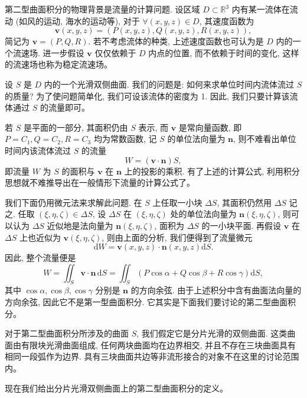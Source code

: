 \documentclass[12pt,fontset=fandol]{ctexart}
\begin{document}
第二型曲面积分的物理背景是流量的计算问题. 设区域 $D\subset\mathbb R^3$ 内有某一流体在流动 (如风的运动, 海水的运动等), 对于 $\forall(x,y,z)\in D$, 其速度函数为
\[
  \boldsymbol v(x,y,z)=(P(x,y,z),Q(x,y,z),R(x,y,z)),
\]
简记为 $\boldsymbol v=(P,Q,R)$. 若不考虑流体的种类, 上述速度函数也可认为是 $D$ 内的一个流速场. 进一步假设 $\boldsymbol v$ 仅仅依赖于 $D$ 内点的位置, 而不依赖于时间的变化, 这样的流速场也称为稳定流速场。

设 $S$ 是 $D$ 内的一个光滑双侧曲面. 我们的问题是: 如何来求单位时间内流体流过 $S$ 的质量? 为了使问题简单化, 我们可设该流体的密度为 1. 因此, 我们只要计算该流体通过 $S$ 的流量即可。

若 $S$ 是平面的一部分, 其面积仍由 $S$ 表示, 而 $\boldsymbol v$ 是常向量函数, 即 $P=C_1,Q=C_2,R=C_3$ 均为常数函数, 记 $S$ 的单位法向量为 $\boldsymbol n$, 则不难看出单位时间内该流体流过 $S$ 的流量
\[
  W=(\boldsymbol v\cdot\boldsymbol n)S,
\]
即流量 $W$ 为 $S$ 的面积与 $\boldsymbol v$ 在 $\boldsymbol n$ 上的投影的乘积. 有了上述的计算公式, 利用积分思想就不难推导出在一般情形下流量的计算公式了。

我们下面仍用微元法来求解此问题. 在 $S$ 上任取一小块 $\Delta S$, 其面积仍然用 $\Delta S$ 记之. 任取 $(\xi,\eta,\zeta)\in\Delta S$, 设 $\Delta S$ 在 $(\xi,\eta,\zeta)$ 处的单位法向量为 $\boldsymbol n(\xi,\eta,\zeta)$, 则可以认为 $\Delta S$ 近似地是法向量为 $\boldsymbol n(\xi,\eta,\zeta)$, 面积为 $\Delta S$ 的一小块平面. 再假设 $\boldsymbol v$ 在 $\Delta S$ 上也近似为 $\boldsymbol v(\xi,\eta,\zeta)$, 则由上面的分析, 我们便得到了流量微元
\[
  \mathrm dW=\boldsymbol v(x,y,z)\cdot\boldsymbol n(x,y,z)\mathrm dS.
\]
因此, 整个流量便是
\[
  W=\iint_S\boldsymbol v\cdot\boldsymbol n\,\mathrm dS
  =\iint_S(P\cos\alpha+Q\cos\beta+R\cos\gamma)\mathrm dS,
\]
其中 $\cos\alpha,\cos\beta,\cos\gamma$ 分别是 $\boldsymbol n$ 的方向余弦. 由于上述积分中含有曲面法向量的方向余弦, 因此它不是第一型曲面积分. 它其实是下面我们要讨论的第二型曲面积分。

对于第二型曲面积分所涉及的曲面 $S$, 我们假定它是分片光滑的双侧曲面. 这类曲面由有限块光滑曲面组成, 任何两块曲面均在边界相交, 并且不存在三块曲面具有相同一段弧作为边界. 具有三块曲面共边等非流形接合的对象不在这里的讨论范围内。

现在我们给出分片光滑双侧曲面上的第二型曲面积分的定义。
\end{document}
